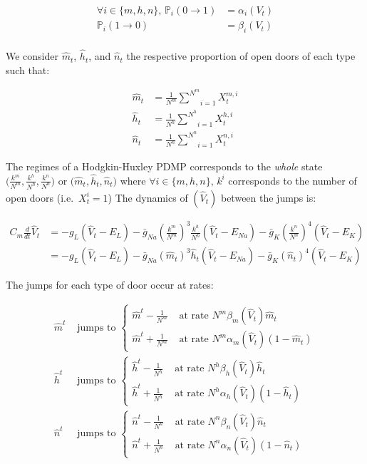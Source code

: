 \documentclass[
]{article}
\begin{document}
\begin{align}
\forall i\in\{m, h, n\},\,\mathbb{P}_i(0\rightarrow1)&=\alpha_i(V_t)\\
\mathbb{P}_i(1\rightarrow0)&=\beta_i(V_t)\\
\end{align}

We consider \(\hat{m}_t\), \(\hat{h}_t\), and \(\hat{n}_t\) the
respective proportion of open doors of each type such that:

\begin{align}
\hat{m}_t &= \frac{1}{N^m}\underset{i=1}{\overset{N^m}{\sum}}X^{m,i}_t\\
\hat{h}_t &= \frac{1}{N^h}\underset{i=1}{\overset{N^h}{\sum}}X^{h,i}_t\\
\hat{n}_t &= \frac{1}{N^n}\underset{i=1}{\overset{N^n}{\sum}}X^{n,i}_t
\end{align}

The regimes of a Hodgkin-Huxley PDMP corresponds to the \emph{whole}
state \(\big(\frac{k^m}{N^m}, \frac{k^h}{N^h}, \frac{k^n}{N^n}\big)\) or
\(\big(\hat{m}_t, \hat{h}_t, \hat{n}_t\big)\) where
\(\forall i\in\{m, h, n\},\,k^i\) corresponds to the number of open
doors (i.e.~\(X_t^i=1\)) The dynamics of \((\hat{V}_t)\) between the
jumps is:

\begin{align}
C_m\frac{d}{dt}\hat{V}_t &= -g_L(\hat{V}_t - E_L) - \bar{g}_{Na} (\frac{k^m}{N^m})^3 \frac{k^h}{N^h} (\hat{V}_t - E_{Na}) - \bar{g}_K(\frac{k^n}{N^n})^4 (\hat{V}_t - E_K)\\
&= -g_L(\hat{V}_t - E_L) - \bar{g}_{Na} (\hat{m}_t)^3 \hat{h}_t (\hat{V}_t - E_{Na}) - \bar{g}_K(\hat{n}_t)^4 (\hat{V}_t - E_K)
\end{align}

The jumps for each type of door occur at rates:

\begin{align}
\hat{m}^t&\text{ jumps to }
  \begin{cases}
    \hat{m}^t-\frac{1}{N^m} & \text{ at rate }N^m\beta_m(\hat{V}_t)\hat{m}_t\\
    \hat{m}^t+\frac{1}{N^m} & \text{ at rate }N^m\alpha_m(\hat{V}_t)(1-\hat{m}_t)
  \end{cases}\\
\hat{h}^t&\text{ jumps to }
  \begin{cases}
    \hat{h}^t-\frac{1}{N^h} & \text{ at rate }N^h\beta_h(\hat{V}_t)\hat{h}_t\\
    \hat{h}^t+\frac{1}{N^h} & \text{ at rate }N^h\alpha_h(\hat{V}_t)(1-\hat{h}_t)
  \end{cases}\\
\hat{n}^t&\text{ jumps to }
  \begin{cases}
    \hat{n}^t-\frac{1}{N^n} & \text{ at rate }N^n\beta_n(\hat{V}_t)\hat{n}_t\\
    \hat{n}^t+\frac{1}{N^n} & \text{ at rate }N^n\alpha_n(\hat{V}_t)(1-\hat{n}_t)
  \end{cases}\\
\end{align}
\end{document}
